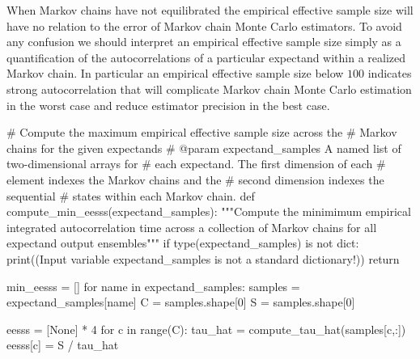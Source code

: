 \documentclass[
  letterpaper,
  DIV=11,
  numbers=noendperiod]{scrartcl}
\newenvironment{Shaded}{\begin{snugshade}}{\end{snugshade}}
\newcommand{\BuiltInTok}[1]{\textcolor[rgb]{0.00,0.23,0.31}{#1}}
\newcommand{\CommentTok}[1]{\textcolor[rgb]{0.37,0.37,0.37}{#1}}
\newcommand{\ControlFlowTok}[1]{\textcolor[rgb]{0.00,0.23,0.31}{#1}}
\newcommand{\DecValTok}[1]{\textcolor[rgb]{0.68,0.00,0.00}{#1}}
\newcommand{\KeywordTok}[1]{\textcolor[rgb]{0.00,0.23,0.31}{#1}}
\newcommand{\NormalTok}[1]{\textcolor[rgb]{0.00,0.23,0.31}{#1}}
\newcommand{\OperatorTok}[1]{\textcolor[rgb]{0.37,0.37,0.37}{#1}}
\newcommand{\StringTok}[1]{\textcolor[rgb]{0.13,0.47,0.30}{#1}}
\newcommand{\VariableTok}[1]{\textcolor[rgb]{0.07,0.07,0.07}{#1}}
\begin{document}
When Markov chains have not equilibrated the empirical effective sample
size will have no relation to the error of Markov chain Monte Carlo
estimators. To avoid any confusion we should interpret an empirical
effective sample size simply as a quantification of the autocorrelations
of a particular expectand within a realized Markov chain. In particular
an empirical effective sample size below \(100\) indicates strong
autocorrelation that will complicate Markov chain Monte Carlo estimation
in the worst case and reduce estimator precision in the best case.

\begin{Shaded}
\begin{Highlighting}[]
\CommentTok{\# Compute the maximum empirical effective sample size across the }
\CommentTok{\# Markov chains for the given expectands}
\CommentTok{\# @param expectand\_samples A named list of two{-}dimensional arrays for }
\CommentTok{\#                          each expectand.  The first dimension of each}
\CommentTok{\#                          element indexes the Markov chains and the }
\CommentTok{\#                          second dimension indexes the sequential }
\CommentTok{\#                          states within each Markov chain.}
\KeywordTok{def}\NormalTok{ compute\_min\_eesss(expectand\_samples):}
  \CommentTok{"""Compute the minimimum empirical integrated autocorrelation time}
\CommentTok{     across a collection of Markov chains for all expectand output}
\CommentTok{     ensembles"""}
  \ControlFlowTok{if} \BuiltInTok{type}\NormalTok{(expectand\_samples) }\KeywordTok{is} \KeywordTok{not} \BuiltInTok{dict}\NormalTok{:}
    \BuiltInTok{print}\NormalTok{((}\StringTok{\textquotesingle{}Input variable \textasciigrave{}expectand\_samples\textasciigrave{} \textquotesingle{}}
           \StringTok{\textquotesingle{}is not a standard dictionary!\textquotesingle{}}\NormalTok{))}
    \ControlFlowTok{return}
      
\NormalTok{  min\_eesss }\OperatorTok{=}\NormalTok{ []}
  \ControlFlowTok{for}\NormalTok{ name }\KeywordTok{in}\NormalTok{ expectand\_samples:}
\NormalTok{    samples }\OperatorTok{=}\NormalTok{ expectand\_samples[name]}
\NormalTok{    C }\OperatorTok{=}\NormalTok{ samples.shape[}\DecValTok{0}\NormalTok{]}
\NormalTok{    S }\OperatorTok{=}\NormalTok{ samples.shape[}\DecValTok{0}\NormalTok{]}
    
\NormalTok{    eesss }\OperatorTok{=}\NormalTok{ [}\VariableTok{None}\NormalTok{] }\OperatorTok{*} \DecValTok{4}
    \ControlFlowTok{for}\NormalTok{ c }\KeywordTok{in} \BuiltInTok{range}\NormalTok{(C):}
\NormalTok{      tau\_hat }\OperatorTok{=}\NormalTok{ compute\_tau\_hat(samples[c,:])}
\NormalTok{      eesss[c] }\OperatorTok{=}\NormalTok{ S }\OperatorTok{/}\NormalTok{ tau\_hat}
    

\end{Highlighting}
\end{Shaded}
\end{document}
